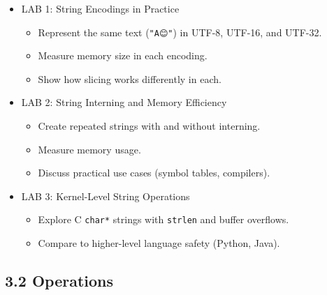 \documentclass[
  letterpaper,
  DIV=11,
  numbers=noendperiod]{scrreprt}
\providecommand{\tightlist}{%
  \setlength{\itemsep}{0pt}\setlength{\parskip}{0pt}}
\begin{document}
\begin{itemize}
\item
  LAB 1: String Encodings in Practice

  \begin{itemize}
  \tightlist
  \item
    Represent the same text (\texttt{"A😊"}) in UTF-8, UTF-16, and
    UTF-32.
  \item
    Measure memory size in each encoding.
  \item
    Show how slicing works differently in each.
  \end{itemize}
\item
  LAB 2: String Interning and Memory Efficiency

  \begin{itemize}
  \tightlist
  \item
    Create repeated strings with and without interning.
  \item
    Measure memory usage.
  \item
    Discuss practical use cases (symbol tables, compilers).
  \end{itemize}
\item
  LAB 3: Kernel-Level String Operations

  \begin{itemize}
  \tightlist
  \item
    Explore C \texttt{char*} strings with \texttt{strlen} and buffer
    overflows.
  \item
    Compare to higher-level language safety (Python, Java).
  \end{itemize}
\end{itemize}

\subsection{3.2 Operations}\label{operations-2}
\end{document}
